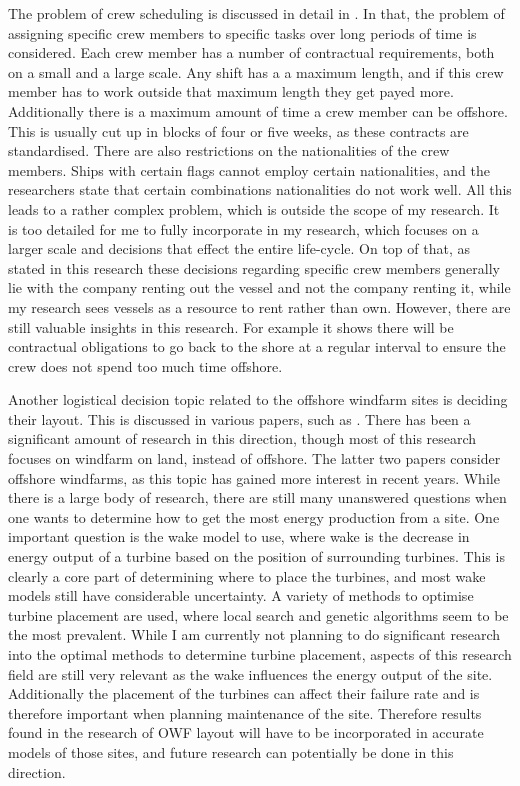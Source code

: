 \documentclass[a4paper,12pt]{article}
\begin{document}
The problem of crew scheduling is discussed in detail in \cite{leggate2010crew}. In that, the problem of assigning specific crew members to specific tasks over long periods of time is considered. Each crew member has a number of contractual requirements, both on a small and a large scale. Any shift has a a maximum length, and if this crew member has to work outside that maximum length they get payed more. Additionally there is a maximum amount of time a crew member can be offshore. This is usually cut up in blocks of four or five weeks, as these contracts are standardised. There are also restrictions on the nationalities of the crew members. Ships with certain flags cannot employ certain nationalities, and the researchers state that certain combinations nationalities do not work well. All this leads to a rather complex problem, which is outside the scope of my research. It is too detailed for me to fully incorporate in my research, which focuses on a larger scale and decisions that effect the entire life-cycle. On top of that, as stated in this research these decisions regarding specific crew members generally lie with the company renting out the vessel and not the company renting it, while my research sees vessels as a resource to rent rather than own. However, there are still valuable insights in this research. For example it shows there will be contractual obligations to go back to the shore at a regular interval to ensure the crew does not spend too much time offshore. 

\bigskip

Another logistical decision topic related to the offshore windfarm sites is deciding their layout. This is discussed in various papers, such as \cite{mosetti1994optimization,kusiak2010design,saavedra2011seeding,perez2013offshore,hou2017combined}. There has been a significant amount of research in this direction, though most of this research focuses on windfarm on land, instead of offshore. The latter two papers \cite{perez2013offshore,hou2017combined} consider offshore windfarms, as this topic has gained more interest in recent years. While there is a large body of research, there are still many unanswered questions when one wants to determine how to get the most energy production from a site. One important question is the wake model to use, where wake is the decrease in energy output of a turbine based on the position of surrounding turbines. This is clearly a core part of determining where to place the turbines, and most wake models still have considerable uncertainty. A variety of methods to optimise turbine placement are used, where local search and genetic algorithms seem to be the most prevalent. While I am currently not planning to do significant research into the optimal methods to determine turbine placement, aspects of this research field are still very relevant as the wake influences the energy output of the site. Additionally the placement of the turbines can affect their failure rate and is therefore important when planning maintenance of the site. Therefore results found in the research of OWF layout will have to be incorporated in accurate models of those sites, and future research can potentially be done in this direction.
\end{document}
